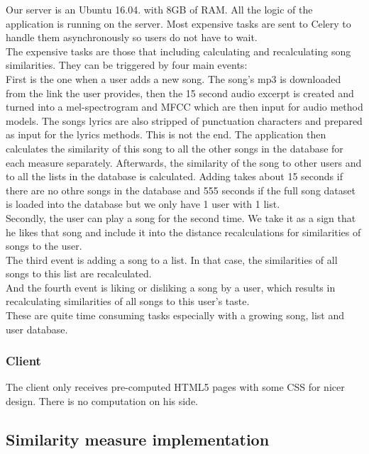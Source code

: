 Our server is an Ubuntu 16.04. with 8GB of RAM. All the logic of the application is running on the server. Most expensive tasks are sent to Celery to handle them asynchronously so users do not have to wait. \\
The expensive tasks are those that including calculating and recalculating song similarities. They can be triggered by four main events: \\
First is the one when a user adds a new song. The song's mp3 is downloaded from the link the user provides, then the 15 second audio excerpt is created and turned into a mel-spectrogram and MFCC which are then input for audio method models. The songs lyrics are also stripped of punctuation characters and prepared as input for the lyrics methods. This is not the end. The application then calculates the similarity of this song to all the other songs in the database for each measure separately. Afterwards, the similarity of the song to other users and to all the lists in the database is calculated. Adding takes about 15 seconds if there are no othre songs in the database and 555 seconds if the full song dataset is loaded into the database but we only have 1 user with 1 list. \\ 
Secondly, the user can play a song for the second time. We take it as a sign that he likes that song and include it into the distance recalculations for similarities of songs to the user.\\
The third event is adding a song to a list. In that case, the similarities of all songs to this list are recalculated. \\
And the fourth event is liking or disliking a song by a user, which results in recalculating similarities of all songs to this user's taste. \\
These are quite time consuming tasks especially with a growing song, list and user database. \\

\subsubsection{Client}
The client only receives pre-computed HTML5 pages with some CSS for nicer design. There is no computation on his side.

\subsection{Similarity measure implementation}

